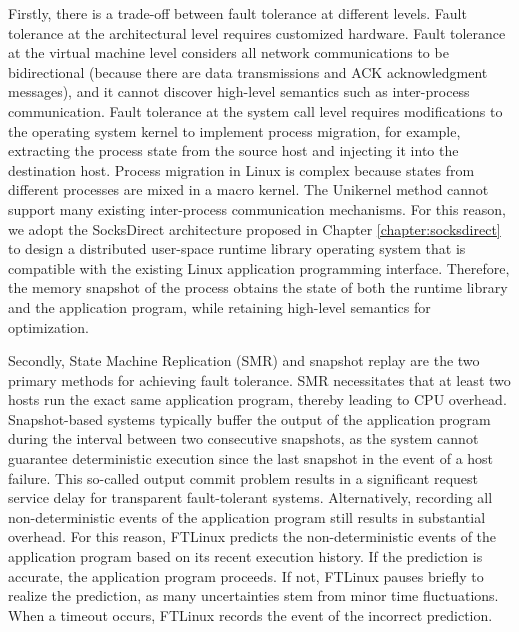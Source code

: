 Firstly, there is a trade-off between fault tolerance at different levels. Fault tolerance at the architectural level requires customized hardware. Fault tolerance at the virtual machine level considers all network communications to be bidirectional (because there are data transmissions and ACK acknowledgment messages), and it cannot discover high-level semantics such as inter-process communication. Fault tolerance at the system call level requires modifications to the operating system kernel to implement process migration, for example, extracting the process state from the source host and injecting it into the destination host. Process migration in Linux is complex because states from different processes are mixed in a macro kernel. The Unikernel method cannot support many existing inter-process communication mechanisms. For this reason, we adopt the SocksDirect architecture proposed in Chapter \ref{chapter:socksdirect} to design a distributed user-space runtime library operating system that is compatible with the existing Linux application programming interface. Therefore, the memory snapshot of the process obtains the state of both the runtime library and the application program, while retaining high-level semantics for optimization.

Secondly, State Machine Replication (SMR) and snapshot replay are the two primary methods for achieving fault tolerance. SMR necessitates that at least two hosts run the exact same application program, thereby leading to CPU overhead. Snapshot-based systems typically buffer the output of the application program during the interval between two consecutive snapshots, as the system cannot guarantee deterministic execution since the last snapshot in the event of a host failure. This so-called output commit problem results in a significant request service delay for transparent fault-tolerant systems. Alternatively, recording all non-deterministic events of the application program still results in substantial overhead. For this reason, FTLinux predicts the non-deterministic events of the application program based on its recent execution history. If the prediction is accurate, the application program proceeds. If not, FTLinux pauses briefly to realize the prediction, as many uncertainties stem from minor time fluctuations. When a timeout occurs, FTLinux records the event of the incorrect prediction.

